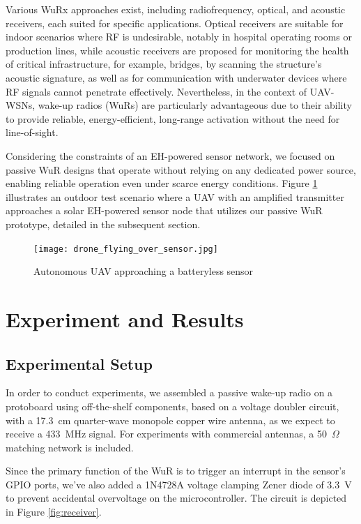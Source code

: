 \documentclass[conference]{IEEEtran}
\begin{document}
Various WuRx approaches exist, including radiofrequency, optical, and acoustic receivers, each suited for specific applications\cite{overview_wurx_survey}. Optical receivers are suitable for indoor scenarios where RF is undesirable\cite{optical_wurx}, notably in hospital operating rooms or production lines, while acoustic receivers are proposed for monitoring the health of critical infrastructure, for example, bridges, by scanning the structure's acoustic signature\cite{acoustic_wurx_structure}, as well as for communication with underwater devices where RF signals cannot penetrate effectively\cite{acoustic_wurx_underwater}. Nevertheless, in the context of UAV-WSNs, wake-up radios (WuRs) are particularly advantageous due to their ability to provide reliable, energy-efficient, long-range activation without the need for line-of-sight\cite{performance_eval_uavwsn}.

Considering the constraints of an EH-powered sensor network, we focused on passive WuR designs that operate without relying on any dedicated power source, enabling reliable operation even under scarce energy conditions. Figure \ref{fig:drone_over_sensor} illustrates an outdoor test scenario where a UAV with an amplified transmitter approaches a solar EH-powered sensor node that utilizes our passive WuR prototype, detailed in the subsequent section.

\begin{figure}[htbp]
  \centerline{\texttt{[image: drone\_flying\_over\_sensor.jpg]}}
  \caption{Autonomous UAV approaching a batteryless sensor}
  \label{fig:drone_over_sensor}
\end{figure}

\section{Experiment and Results}

\subsection{Experimental Setup}

In order to conduct experiments, we assembled a passive wake-up radio on a protoboard using off-the-shelf components, based on a voltage doubler circuit, with a 17.3~cm quarter-wave monopole copper wire antenna, as we expect to receive a 433~MHz signal. For experiments with commercial antennas, a 50~$\Omega$ matching network is included.

Since the primary function of the WuR is to trigger an interrupt in the sensor's GPIO ports, we've also added a 1N4728A voltage clamping Zener diode of 3.3~V to prevent accidental overvoltage on the microcontroller. The circuit is depicted in Figure \ref{fig:receiver}.
\end{document}
